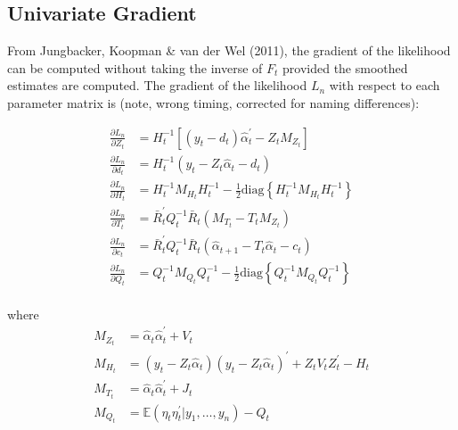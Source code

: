 \documentclass[12pt]{article}
\newcommand{\Gt}{G_\theta}
\newcommand{\vecop}[0]{\text{vec}}
\begin{document}

\subsection*{Univariate Gradient}


	From Jungbacker, Koopman \& van der Wel (2011), the gradient of the likelihood can be computed without taking the inverse of $F_t$ provided the smoothed estimates are computed. The gradient of the likelihood $L_n$ with respect to each parameter matrix is (note, wrong timing, corrected for naming differences):

	\begin{align*}
	\frac{\partial L_n}{\partial Z_t} &= H_t^{-1} \left[(y_t - d_t)\hat{\alpha}_t^\prime - Z_t M_{Z_t} \right] \\
	\frac{\partial L_n}{\partial d_t} &= H_t^{-1} (y_t - Z_t \hat{\alpha}_t - d_t) \\
	\frac{\partial L_n}{\partial H_t} &= H_t^{-1} M_{H_t} H_t^{-1} - \frac{1}{2} \text{diag} \left\{ H_t^{-1} M_{H_t} H_t^{-1}\right\} \\
	\frac{\partial L_n}{\partial T_t} &= \bar{R}_t^\prime Q_t^{-1} \bar{R}_t (M_{T_t} - T_t M_{Z_t}) \\
	\frac{\partial L_n}{\partial c_t} &= \bar{R}_t^\prime Q_t^{-1} \bar{R}_t (\hat{\alpha}_{t+1} - T_t \hat{\alpha}_t - c_t) \\
	\frac{\partial L_n}{\partial Q_t} &= Q_t^{-1} M_{Q_t} Q_t^{-1} - \frac{1}{2} \text{diag} \left\{ Q_t^{-1} M_{Q_t} Q_t^{-1} \right\} \\
	\end{align*}

	where 
	\begin{align*}
	M_{Z_t} &= \hat{\alpha}_t \hat{\alpha}_t^\prime + V_t\\
	M_{H_t} &= (y_t - Z_t \hat{\alpha}_t) (y_t - Z_t \hat{\alpha}_t)^\prime + Z_t V_t Z_t^\prime - H_t \\
	M_{T_t} &= \hat{\alpha}_t \hat{\alpha}_t^\prime + J_t\\
	M_{Q_t} &= \mathbb{E}(\eta_t \eta_t^\prime | y_1, \dots, y_n) - Q_t
	\end{align*}
\end{document}
